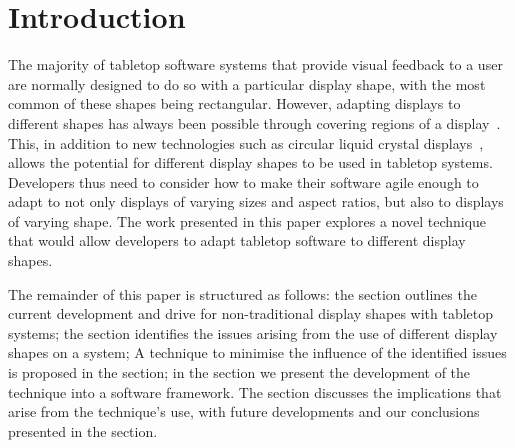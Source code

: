 \documentclass[twocolumn,compsoc]{cvm}
\begin{document}
\MakePageStyle




\section*{Introduction}
\label{sec:intro}

The majority of tabletop software systems that provide visual feedback to a user are normally designed to do so with a particular display shape, with the most common of these shapes being rectangular.
However, adapting displays to different shapes has always been possible through covering regions of a display~\cite{Dietz2004}.
This, in addition to new technologies such as circular liquid crystal displays~\cite{Boyd2007,Finney2009}, allows the potential for different display shapes to be used in tabletop systems. 
Developers thus need to consider how to make their software agile enough to adapt to not only displays of varying sizes and aspect ratios, but also to displays of varying shape.
The work presented in this paper explores a novel technique that would allow developers to adapt tabletop software to different display shapes.

The remainder of this paper is structured as follows: the  section outlines the current development and drive for non-traditional display shapes with tabletop systems; the  section identifies the issues arising from the use of different display shapes on a system;
A technique to minimise the influence of the identified issues is proposed in the  section; in the  section we present the development of the technique into a software framework.
The  section discusses the implications that arise
from the technique's use, with future developments and our conclusions presented in the  section.
\end{document}
